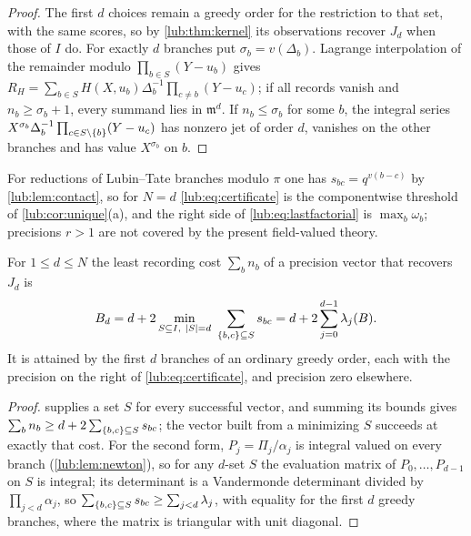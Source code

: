 \begin{proof}
The first $d$ choices remain a greedy order for the restriction to that set, with the same scores,
so by \cref{lub:thm:kernel} its observations recover $J_d$ when those of $I$ do. For exactly $d$
branches put $\sigma_b=v(\Delta_b)$. Lagrange interpolation of the remainder modulo
$\prod_{b\in S}(Y-u_b)$ gives $R_H=\sum_{b\in S}H(X,u_b)\Delta_b^{-1}\prod_{c\ne b}(Y-u_c)$; if all
records vanish and $n_b\ge\sigma_b+1$, every summand lies in $\mathfrak m^d$. If $n_b\le\sigma_b$ for
some $b$, the integral series $X^{\sigma_b}\Delta_b^{-1}\prod_{c\in S\setminus\{b\}}(Y-u_c)$ has nonzero jet
of order $d$, vanishes on the other branches and has value $X^{\sigma_b}$ on $b$.
\end{proof}

For reductions of Lubin--Tate branches modulo $\pi$ one has $s_{bc}=q^{v(b-c)}$ by
\cref{lub:lem:contact}, so for $N=d$ \eqref{lub:eq:certificate} is the componentwise threshold of
\cref{lub:cor:unique}(a), and the right side of \eqref{lub:eq:lastfactorial} is $\max_b\omega_b$;
precisions $r>1$ are not covered by the present field-valued theory.

\begin{theorem}\label{lub:thm:budget}
For $1\le d\le N$ the least recording cost $\sum_bn_b$ of a precision vector that recovers $J_d$ is
\[
 B_d=d+2\min_{S\subseteq I,\ \abs S=d}\ \sum_{\set{b,c}\subseteq S}s_{bc}
 =d+2\sum_{j=0}^{d-1}\lambda_j(B).
\]
It is attained by the first $d$ branches of an ordinary greedy order, each with the precision on the
right of \eqref{lub:eq:certificate}, and precision zero elsewhere.
\end{theorem}

\begin{proof}
 supplies a set $S$ for every successful vector, and summing its bounds gives
$\sum_bn_b\ge d+2\sum_{\{b,c\}\subseteq S}s_{bc}$; the vector built from a minimizing $S$ succeeds
at exactly that cost. For the second form, $P_j=\Pi_j/\alpha_j$ is integral valued on every branch
(\cref{lub:lem:newton}), so for any $d$-set $S$ the evaluation matrix of $P_0,\dots,P_{d-1}$ on $S$ is
integral; its determinant is a Vandermonde determinant divided by $\prod_{j<d}\alpha_j$, so
$\sum_{\{b,c\}\subseteq S}s_{bc}\ge\sum_{j<d}\lambda_j$, with equality for the first $d$ greedy
branches, where the matrix is triangular with unit diagonal.
\end{proof}

